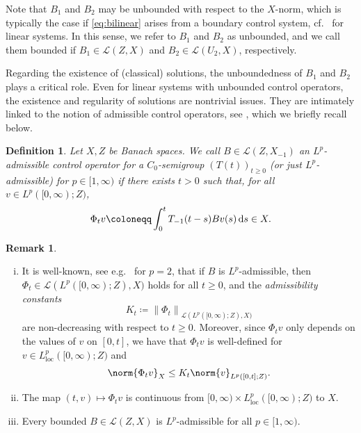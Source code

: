 \documentclass{cocv}
\newcommand{\ds}{ {\, \rm d} s}
\newcommand{\nm}[2][]{\left\lVert #2 \right\rVert_{#1}}
\DeclareMathOperator{\loc}{loc}
\newtheorem{definition}{Definition}
\theoremstyle{definition}
\newtheorem{remark}{Remark}
\begin{document}
Note that $B_1$ and $B_2$ may be unbounded with respect to the $X$-norm, which is typically the case if \eqref{eq:bilinear} arises from a boundary control system, cf.\ \cite[Ch.~10]{MR2502023} for linear systems.
In this sense, we refer to $B_1$ and $B_2$ as unbounded, and we call them bounded if $B_1 \in \mathcal{L}(Z,X)$ and $B_2 \in \mathcal{L}(U_2,X)$, respectively.



Regarding the existence of (classical) solutions, the unboundedness of $B_1$ and $B_2$ plays a critical role.
Even for linear systems with unbounded control operators, the existence and regularity of solutions are nontrivial issues. They are intimately linked to the notion of admissible control operators, see \cite[Ch.~4]{MR2502023}, which we briefly recall below.



\begin{definition}
   Let $X,Z$ be Banach spaces. We call $B \in \mathcal{L}(Z, X_{-1})$ an \emph{$L^p$-admissible control operator} for a $C_0$-semigroup $(T(t))_{t \geq 0}$ (or just \emph{$L^p$-admissible}) for $p \in [1, \infty)$ if there exists $t > 0$ such that, for all $v \in L^p([0,\infty);Z)$,
    \begin{equation}\label{eq:inputmap}
     \Phi_t v \coloneqq \int_0^t T_{-1}(t-s)Bv(s)  \ds \in X.   
    \end{equation}
\end{definition}


\begin{remark}\label{rem:admissibility}
\begin{enumerate}[(i)]
    \item
    It is well-known, see e.g.~\cite[Prop.~4.2.2~\&~Prop.~4.2.4]{MR2502023} for $p=2$, that if $B$ is $L^p$-admissible, then $\Phi_t \in \mathcal{L}(L^p([0, \infty);Z),X)$ holds for all $t \geq 0$, and the \emph{admissibility constants}
    \begin{equation*}
        K_t \coloneqq \nm[\mathcal{L}(L^p([0, \infty); Z), X)]{\Phi_t}
    \end{equation*}
    are non-decreasing with respect to $t\geq 0$. Moreover, since $\Phi_t v$ only depends on the values of $v$ on $[0,t]$, we have that $\Phi_t v$ is well-defined for $v \in L^p_{\loc}([0,\infty);Z)$ and
    \begin{equation*}
        \norm{\Phi_t v}_X \leq K_t \norm{v}_{L^p([0,t];Z)}. 
    \end{equation*}
\item The map $(t,v) \mapsto \Phi_t v$ is continuous from $[0,\infty) \times L^p_{\loc}([0,\infty);Z)$ to $X$.

\item    Every bounded $B \in \mathcal L(Z,X)$ is $L^p$-admissible for all $p \in [1,\infty)$.
    \end{enumerate}
\end{remark}
\end{document}

